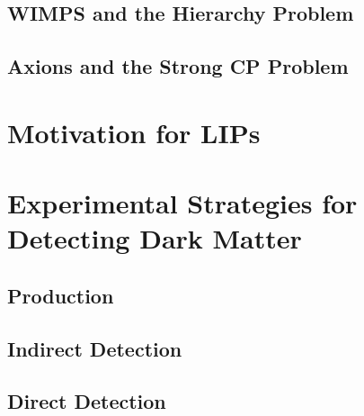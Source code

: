 \subsection{WIMPS and the Hierarchy Problem}
\subsection{Axions and the Strong CP Problem}

\section{Motivation for LIPs}

\section{Experimental Strategies for Detecting Dark Matter}
\subsection{Production}

\subsection{Indirect Detection}

\subsection{Direct Detection}
